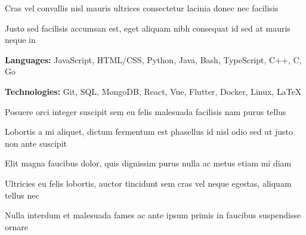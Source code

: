 \documentclass{resume-template}
\begin{document}

\begin{bullets}
\item Cras vel convallis nisl mauris ultrices consectetur lacinia donec nec facilisis
\item Justo sed facilisis accumsan est, eget aliquam nibh consequat id sed at mauris neque in
\end{bullets}

\vspace{-\spaceAfterSectionDelimeter}

\begin{bullets}
\item \textbf{Languages:} JavaScript, HTML/CSS, Python, Java, Bash, TypeScript, C++, C, Go
\item \textbf{Technologies:} Git, SQL, MongoDB, React, Vue, Flutter, Docker, Linux, \LaTeX
\end{bullets}


\vspace{-\spaceAfterExperienceHeader}

\begin{bullets}
\item Posuere orci integer suscipit sem eu felis malesuada facilisis nam purus tellus
\item Lobortis a mi aliquet, dictum fermentum est phasellus id nisl odio sed ut justo non ante suscipit
\end{bullets}

\vspace{-\spaceAfterSectionDelimeter}

\begin{bullets}
\item Elit magna faucibus dolor, quis dignissim purus nulla ac metus etiam mi diam
\item Ultricies eu felis lobortis, auctor tincidunt sem cras vel neque egestas, aliquam tellus nec
\item Nulla interdum et malesuada fames ac ante ipsum primis in faucibus suspendisse ornare
\end{bullets}
\end{document}
